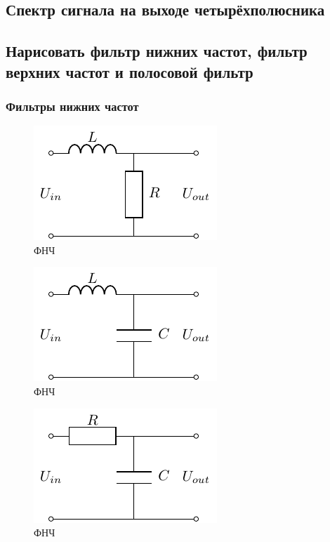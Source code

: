 \documentclass[a4paper,14pt]{extarticle}
\theoremstyle{definition}
\begin{document}
\subsection{Спектр сигнала на выходе четырёхполюсника}

\subsection{Нарисовать фильтр нижних частот, фильтр верхних частот и полосовой фильтр}
\subsubsection{Фильтры нижних частот}

\begin{figure}[h]
	\centering
	\includegraphics[width=0.5\linewidth]{chem_m/task13a}
	\caption{ФНЧ}
	\label{fig:13a}
\end{figure}

\begin{figure}[h]
	\centering
	\includegraphics[width=0.5\linewidth]{chem_m/task13b}
	\caption{ФНЧ}
	\label{fig:13b}
\end{figure}

\begin{figure}[h]
	\centering
	\includegraphics[width=0.5\linewidth]{chem_m/task13c}
	\caption{ФНЧ}
	\label{fig:13c}
\end{figure}
\end{document}
